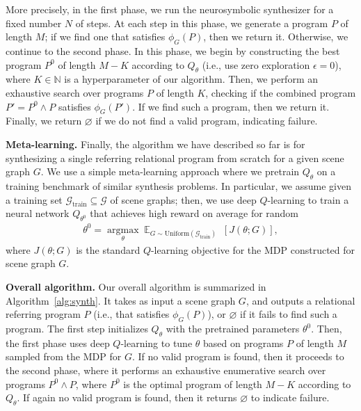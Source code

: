 More precisely, in the first phase, we run the neurosymbolic synthesizer for a fixed number $N$ of steps. At each step in this phase, we generate a program $P$ of length $M$; if we find one that satisfies $\phi_G(P)$, then we return it. Otherwise, we continue to the second phase. In this phase, we begin by constructing the best program $P^0$ of length $M-K$ according to $Q_{\theta}$ (i.e., use zero exploration $\epsilon=0$), where $K\in\mathbb{N}$ is a hyperparameter of our algorithm. Then, we perform an exhaustive search over programs $P$ of length $K$, checking if the combined program $P'=P^0\wedge P$ satisfies $\phi_G(P')$. If we find such a program, then we return it. Finally, we return $\varnothing$ if we do not find a valid program, indicating failure.  

\textbf{Meta-learning.}
%
Finally, the algorithm we have described so far is for synthesizing a single referring relational program from scratch for a given scene graph $G$. We use a simple meta-learning approach where we pretrain $Q_{\theta}$ on a training benchmark of similar synthesis problems. In particular, we assume given a training set $\mathcal{G}_{\text{train}}\subseteq\mathcal{G}$ of scene graphs; then, we use deep $Q$-learning to train a neural network $Q_{\theta^0}$ that achieves high reward on average for random 
\begin{align*}
\theta^0=\operatorname*{\arg\max}_{\theta}\mathop{\mathbb{E}}_{G\sim\text{Uniform}(\mathcal{G}_{\text{train}})} \;[J(\theta;G)],
\end{align*}
where $J(\theta;G)$ is the standard $Q$-learning objective for the MDP constructed for scene graph $G$.

\textbf{Overall algorithm.}
%
Our overall algorithm is summarized in Algorithm~\ref{alg:synth}. It takes as input a scene graph $G$, and outputs a relational referring program $P$ (i.e., that satisfies $\phi_G(P)$), or $\varnothing$ if it fails to find such a program. The first step initializes $Q_{\theta}$ with the pretrained parameters $\theta^0$. Then, the first phase uses deep $Q$-learning to tune $\theta$ based on programs $P$ of length $M$ sampled from the MDP for $G$. If no valid program is found, then it proceeds to the second phase, where it performs an exhaustive enumerative search over programs $P^0\wedge P$, where $P^0$ is the optimal program of length $M-K$ according to $Q_{\theta}$. If again no valid program is found, then it returns $\varnothing$ to indicate failure.